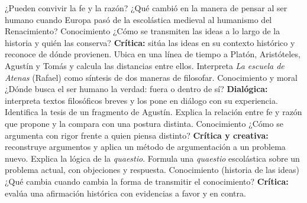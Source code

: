 \documentclass[malla]{planeacion}
\begin{document}
\begin{malla}{¿Pueden convivir la fe y la razón? ¿Qué cambió en la manera de pensar al ser humano
  cuando Europa pasó de la escolástica medieval al humanismo del Renacimiento?}
    {Conocimiento}
    {¿Cómo se transmiten las ideas a lo largo de la historia y quién las conserva?}
    {\textbf{Crítica:} sitúa las ideas en su contexto histórico y reconoce de dónde provienen.}
    {\punto Ubica en una línea de tiempo a Platón, Aristóteles, Agustín y Tomás y calcula las
     distancias entre ellos.
     \punto Interpreta \emph{La escuela de Atenas} (Rafael) como síntesis de dos maneras de
     filosofar.}
    {Conocimiento y moral}
    {¿Dónde busca el ser humano la verdad: fuera o dentro de sí?}
    {\textbf{Dialógica:} interpreta textos filosóficos breves y los pone en diálogo con su
     experiencia.}
    {\punto Identifica la tesis de un fragmento de Agustín.
     \punto Explica la relación entre fe y razón que propone y la compara con una postura
     distinta.}
    {Conocimiento}
    {¿Cómo se argumenta con rigor frente a quien piensa distinto?}
    {\textbf{Crítica y creativa:} reconstruye argumentos y aplica un método de argumentación a
     un problema nuevo.}
    {\punto Explica la lógica de la \emph{quaestio}.
     \punto Formula una \emph{quaestio} escolástica sobre un problema actual, con objeciones y
     respuesta.}
    {Conocimiento (historia de las ideas)}
    {¿Qué cambia cuando cambia la forma de transmitir el conocimiento?}
    {\textbf{Crítica:} evalúa una afirmación histórica con evidencias a favor y en contra.}

\end{malla}
\end{document}
